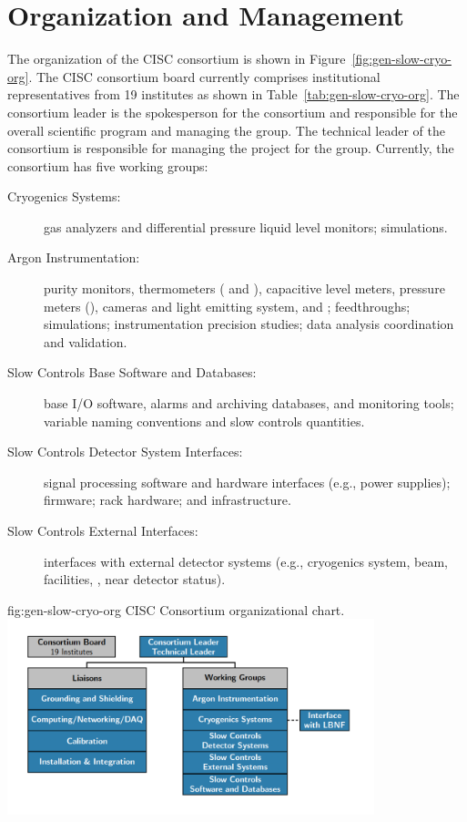 \section{Organization and Management}
\label{sec:cisc-slow-controls-org}


The organization of the CISC consortium is shown in
 Figure~\ref{fig:gen-slow-cryo-org}. The CISC consortium board currently comprises institutional representatives from 19 institutes as shown in Table~\ref{tab:gen-slow-cryo-org}. The consortium leader is the spokesperson for the consortium and responsible for the overall scientific program and managing the group. The technical leader of the consortium is responsible for managing the project for the group. Currently, the
consortium has five working groups:
\begin{description}
 \item[Cryogenics Systems:] gas analyzers and differential pressure liquid level
  monitors;  simulations.
 \item[Argon Instrumentation:] purity monitors, thermometers ( and ), capacitive level meters, pressure meters (), cameras and light emitting system, and ; feedthroughs; \efield simulations; instrumentation precision studies;  data analysis coordination and validation. 
 \item [Slow Controls Base Software and Databases:]  base I/O software, alarms and archiving databases, and monitoring tools;
   variable naming conventions and slow controls quantities.
 \item [Slow Controls Detector System Interfaces:] signal processing software and hardware interfaces (e.g., power supplies); firmware; rack hardware; and infrastructure.   
 \item [Slow Controls External Interfaces:] interfaces with external detector systems (e.g., cryogenics system, beam, facilities, , near detector status).
\end{description}

\begin{dunefigure}{fig:gen-slow-cryo-org}
{CISC Consortium organizational chart.}
\includegraphics[width=0.8\textwidth]{graphics/cisc_org_20190716_zoomedin.png}
\end{dunefigure}

